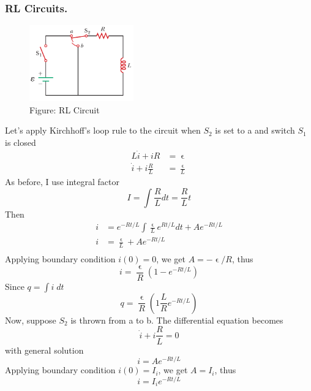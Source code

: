 \documentclass[../../../main.tex]{subfiles}
\begin{document}
\subsubsection*{RL Circuits.} 
\begin{figure}[b]
    \centering
    \includegraphics[width=0.4\textwidth]{../Rss/Electromagnetism/Electrodynamics/RLCirc.png}
    \caption*{Figure: RL Circuit}
\end{figure}
Let’s apply Kirchhoff’s loop rule to the circuit when $S_2$ is set to a and switch $S_1$ is closed
\begin{align*}
    L\dot{i}+iR&=\upvarepsilon\\
    \dot{i}+i\frac{R}{L}&=\frac{\upvarepsilon}{L}
\end{align*}
As before, I use integral factor
\begin{equation*}
    I=\int \frac{R}{L}dt=\frac{R}{L}t
\end{equation*}
Then 
\begin{align*}
    i&=e^{-Rt/L}\int \frac{\upvarepsilon}{L}e^{Rt/L}dt+Ae^{-Rt/L}\\
    i&=\frac{\upvarepsilon}{L}+Ae^{-Rt/L}\\
\end{align*}
Applying boundary condition $i(0) = 0$, we get $A=-\upvarepsilon/R$, thus
\begin{equation*}
    i=\frac{\upvarepsilon}{R}(1-e^{-Rt/L})
\end{equation*}
Since $q= \int i\;dt$
\begin{equation*}
    q=\frac{\upvarepsilon}{R}(1\frac{L}{R}e^{-Rt/L})
\end{equation*}
Now, suppose $S_2$ is thrown from a to b. The differential equation becomes
\begin{equation*}
    \dot{i}+i\frac{R}{L}=0
\end{equation*}
with general solution
\begin{equation*}
    i=Ae^{-Rt/L}
\end{equation*}
Applying boundary condition $i(0) = I_i$, we get $A = I_i$, thus
\begin{equation*}
    i=I_ie^{-Rt/L}
\end{equation*}
\end{document}
